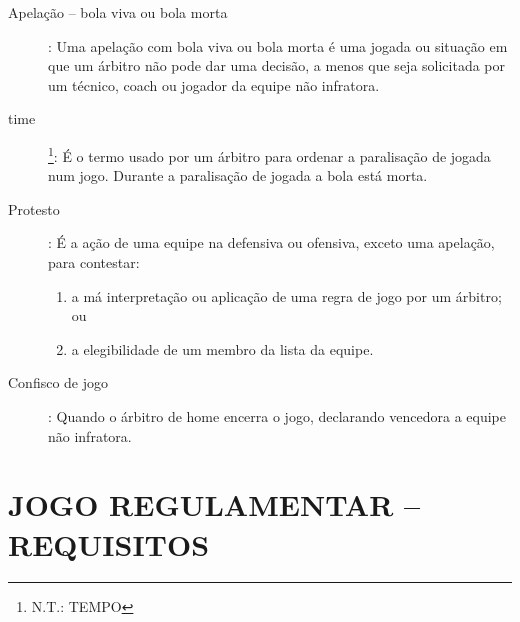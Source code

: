 \begin{description}
\item[Apela\c{c}\~ao -- bola viva ou bola morta]: Uma apela\c{c}\~ao com bola viva ou bola morta \'e uma jogada ou situa\c{c}\~ao em que um \'arbitro n\~ao pode dar uma decis\~ao, a menos que seja  solicitada por um t\'ecnico, \gls{coach} ou jogador da equipe n\~ao infratora. 

\item[\Gls{time}]\footnote{N.T.: TEMPO}: \'E o termo usado por um \'arbitro para ordenar a paralisa\c{c}\~ao de jogada num jogo. Durante a paralisa\c{c}\~ao de jogada a bola est\'a morta. 


\item[Protesto]: \'E a a\c{c}\~ao de uma equipe na defensiva ou ofensiva, exceto uma apela\c{c}\~ao, para contestar: 

\begin{enumerate}[label=\alph*)]
	\item a m\'a interpreta\c{c}\~ao ou aplica\c{c}\~ao de uma regra de jogo por um \'arbitro; ou 
	\item  a elegibilidade de um membro da lista da equipe. 

\end{enumerate}

\item[Confisco de jogo]: Quando o \'arbitro de \gls{home} encerra o jogo, declarando vencedora a equipe n\~ao infratora. 

\end{description}	

 
\section{JOGO REGULAMENTAR -- REQUISITOS}

